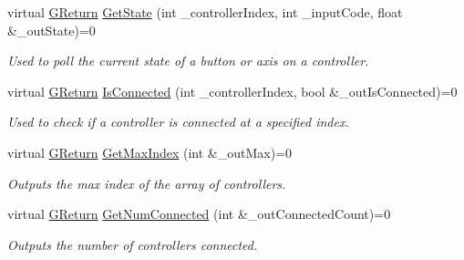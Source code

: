 \begin{DoxyCompactItemize}
\item 
\mbox{\label{classGW_1_1SYSTEM_1_1GController_a82063acba6d46aa5aed46413cdc0e4a6}} 
virtual \mbox{\hyperlink{namespaceGW_a67a839e3df7ea8a5c5686613a7a3de21}{G\+Return}} \mbox{\hyperlink{classGW_1_1SYSTEM_1_1GController_a82063acba6d46aa5aed46413cdc0e4a6}{Get\+State}} (int \+\_\+controller\+Index, int \+\_\+input\+Code, float \&\+\_\+out\+State)=0
\begin{DoxyCompactList}\small\item\em Used to poll the current state of a button or axis on a controller. \end{DoxyCompactList}\item 
\mbox{\label{classGW_1_1SYSTEM_1_1GController_ac0692af48ccfd57c3f786ab15ed671b2}} 
virtual \mbox{\hyperlink{namespaceGW_a67a839e3df7ea8a5c5686613a7a3de21}{G\+Return}} \mbox{\hyperlink{classGW_1_1SYSTEM_1_1GController_ac0692af48ccfd57c3f786ab15ed671b2}{Is\+Connected}} (int \+\_\+controller\+Index, bool \&\+\_\+out\+Is\+Connected)=0
\begin{DoxyCompactList}\small\item\em Used to check if a controller is connected at a specified index. \end{DoxyCompactList}\item 
\mbox{\label{classGW_1_1SYSTEM_1_1GController_a137bbcedb9bc62675e4c3606bb483d5b}} 
virtual \mbox{\hyperlink{namespaceGW_a67a839e3df7ea8a5c5686613a7a3de21}{G\+Return}} \mbox{\hyperlink{classGW_1_1SYSTEM_1_1GController_a137bbcedb9bc62675e4c3606bb483d5b}{Get\+Max\+Index}} (int \&\+\_\+out\+Max)=0
\begin{DoxyCompactList}\small\item\em Outputs the max index of the array of controllers. \end{DoxyCompactList}\item 
\mbox{\label{classGW_1_1SYSTEM_1_1GController_ae7905c691a0304c11c70d337d708e5b8}} 
virtual \mbox{\hyperlink{namespaceGW_a67a839e3df7ea8a5c5686613a7a3de21}{G\+Return}} \mbox{\hyperlink{classGW_1_1SYSTEM_1_1GController_ae7905c691a0304c11c70d337d708e5b8}{Get\+Num\+Connected}} (int \&\+\_\+out\+Connected\+Count)=0
\begin{DoxyCompactList}\small\item\em Outputs the number of controllers connected. \end{DoxyCompactList}\item 

\end{DoxyCompactItemize}
